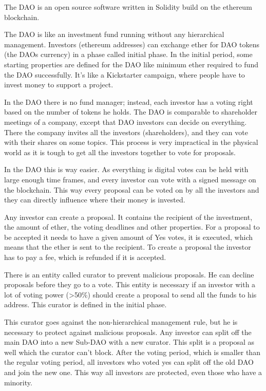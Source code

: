 \documentclass[a4paper, 11pt]{scrartcl}
\begin{document}
The DAO is an open source software written in Solidity build on the ethereum blockchain.

The DAO is like an investment fund running without any hierarchical management.
Investors (ethereum addresses) can exchange ether for DAO tokens (the DAOs currency) in a phase called initial phase. In the initial period, some starting properties are defined for the DAO like minimum ether required to fund the DAO successfully. It's like a Kickstarter campaign, where people have to invest money to support a project.

In the DAO there is no fund manager; instead, each investor has a voting right based on the number of tokens he holds. The DAO is comparable to shareholder meetings of a company, except that DAO investors can decide on everything. There the company invites all the investors (shareholders), and they can vote with their shares on some topics. This process is very impractical in the physical world as it is tough to get all the investors together to vote for proposals. 

In the DAO this is way easier. As everything is digital votes can be held with large enough time frames, and every investor can vote with a signed message on the blockchain. This way every proposal can be voted on by all the investors and they can directly influence where their money is invested. 

Any investor can create a proposal. It contains the recipient of the investment, the amount of ether, the voting deadlines and other properties. For a proposal to be accepted it needs to have a given amount of Yes votes, it is executed, which means that the ether is sent to the recipient. To create a proposal the investor has to pay a fee, which is refunded if it is accepted. 

There is an entity called curator to prevent malicious proposals. He can decline proposals before they go to a vote. This entity is necessary if an investor with a lot of voting power (>50\%) should create a proposal to send all the funds to his address. This curator is defined in the initial phase.

This curator goes against the non-hierarchical management rule, but he is necessary to protect against malicious proposals. Any investor can split off the main DAO into a new Sub-DAO with a new curator. This split is a proposal as well which the curator can't block. After the voting period, which is smaller than the regular voting period, all investors who voted yes can split off the old DAO and join the new one. This way all investors are protected, even those who have a minority.
\end{document}
